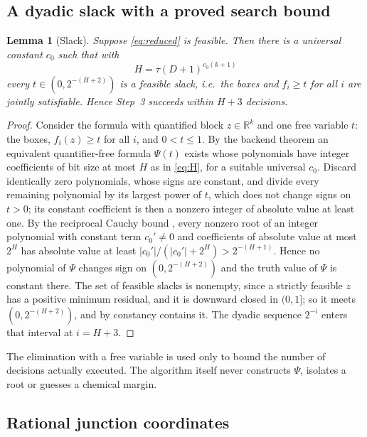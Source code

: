 \documentclass[11pt,a4paper]{article}
\theoremstyle{plain}
\newtheorem{lemma}[theorem]{Lemma}
\theoremstyle{definition}
\theoremstyle{remark}
\newcommand{\R}{\mathbb{R}}
\begin{document}
\subsection{A dyadic slack with a proved search bound}

\begin{lemma}[Slack]\label{lem:slack}
Suppose \eqref{eq:reduced} is feasible. Then there is a universal constant $c_0$ such that with
\begin{equation}\label{eq:H}
  H=\tau(D+1)^{c_0(k+1)}
\end{equation}
every $t\in(0,2^{-(H+2)})$ is a feasible slack, i.e.\ the boxes and $f_i\ge t$ for all $i$ are jointly satisfiable. Hence Step~3 succeeds within $H+3$ decisions.
\end{lemma}

\begin{proof}
Consider the formula with quantified block $z\in\R^k$ and one free variable $t$: the boxes, $f_i(z)\ge t$ for all $i$, and $0<t\le1$. By the backend theorem an equivalent quantifier-free formula $\Psi(t)$ exists whose polynomials have integer coefficients of bit size at most $H$ as in \eqref{eq:H}, for a suitable universal $c_0$. Discard identically zero polynomials, whose signs are constant, and divide every remaining polynomial by its largest power of $t$, which does not change signs on $t>0$; its constant coefficient is then a nonzero integer of absolute value at least one. By the reciprocal Cauchy bound \citep{mignotte1992}, every nonzero root of an integer polynomial with constant term $c_0'\neq0$ and coefficients of absolute value at most $2^H$ has absolute value at least $|c_0'|/(|c_0'|+2^H)>2^{-(H+1)}$. Hence no polynomial of $\Psi$ changes sign on $(0,2^{-(H+2)})$ and the truth value of $\Psi$ is constant there. The set of feasible slacks is nonempty, since a strictly feasible $z$ has a positive minimum residual, and it is downward closed in $(0,1]$; so it meets $(0,2^{-(H+2)})$, and by constancy contains it. The dyadic sequence $2^{-i}$ enters that interval at $i=H+3$.
\end{proof}

The elimination with a free variable is used only to bound the number of decisions actually executed. The algorithm itself never constructs $\Psi$, isolates a root or guesses a chemical margin.

\subsection{Rational junction coordinates}
\end{document}
